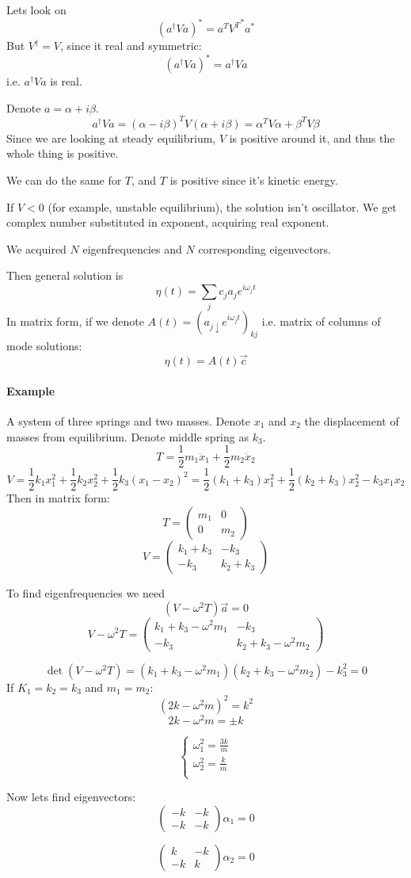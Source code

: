 Lets look on 
$$\left(a^\dagger V a\right)^* = a^T {V^T}^* a^*$$
But $V^\dagger = V$, since it real and symmetric:
$$\left(a^\dagger V a\right)^*  = a^\dagger V a$$
i.e. $a^\dagger V a$ is real.

Denote $a = \alpha + i \beta$.
$$a^\dagger V a = \left(\alpha - i \beta\right)^TV\left(\alpha + i \beta\right) = \alpha^T V \alpha + \beta^T V \beta $$
Since we are looking at steady equilibrium, $V$ is positive around it, and thus the whole thing is positive. 

We can do the same for $T$, and $T$ is positive since it's kinetic energy. 

If $V<0$ (for example, unstable equilibrium), the solution isn't oscillator. We get complex number substituted in exponent, acquiring real exponent.

We acquired $N$ eigenfrequencies and $N$ corresponding eigenvectors.

Then general solution is
$$\eta(t) = \sum_j c_j a_j e^{i\omega_j t}$$
In matrix form, if we denote $A(t) = \left(a_{j\downarrow} e^{i\omega_j t}\right)_{kj}$ i.e. matrix of columns of mode solutions:
$$\eta(t) = A(t)\vec{c} $$

\paragraph{Example}
A system of three springs and two masses. Denote $x_1$ and $x_2$ the displacement of masses from equilibrium. Denote middle spring as $k_3$.
$$T = \frac{1}{2}m_1\ddot{x}_1+\frac{1}{2}m_2\ddot{x}_2$$
$$V = \frac{1}{2}k_1x_1^2+\frac{1}{2}k_2x_2^2+\frac{1}{2}k_3(x_1-x_2)^2 = \frac{1}{2} (k_1+k_3)x_1^2 +  \frac{1}{2} (k_2+k_3)x_2^2 - k_3 x_1x_2$$
Then in matrix form:
$$T  = \begin{pmatrix}
m_1&0\\0&m_2
\end{pmatrix}$$
$$V  = \begin{pmatrix}
k_1+k_3&-k_3\\-k_3&k_2+k_3
\end{pmatrix}$$

To find eigenfrequencies we need
$$(V - \omega^2 T) \vec{a} = 0$$
$$V - \omega^2 T =  \begin{pmatrix}
k_1+k_3-\omega^2m_1&-k_3\\-k_3&k_2+k_3-\omega^2m_2
\end{pmatrix}$$

$$\det (V - \omega^2 T) = (k_1+k_3-\omega^2m_1)(k_2+k_3-\omega^2m_2) - k_3^2 = 0$$
If $K_1=k_2=k_3$ and $m_1=m_2$:
$$(2k-\omega^2m)^2 = k^2$$
$$2k - \omega^2 m = \pm k$$

$$ \begin{cases}
\omega^2_1 =\frac{3k}{m}\\
\omega^2_2 =\frac{k}{m}\\
\end{cases}$$

Now lets find eigenvectors:
$$\begin{pmatrix}
-k & -k\\-k&-k
\end{pmatrix} \alpha_1 = 0$$


$$\begin{pmatrix}
k & -k\\-k&k
\end{pmatrix} \alpha_2 = 0$$

